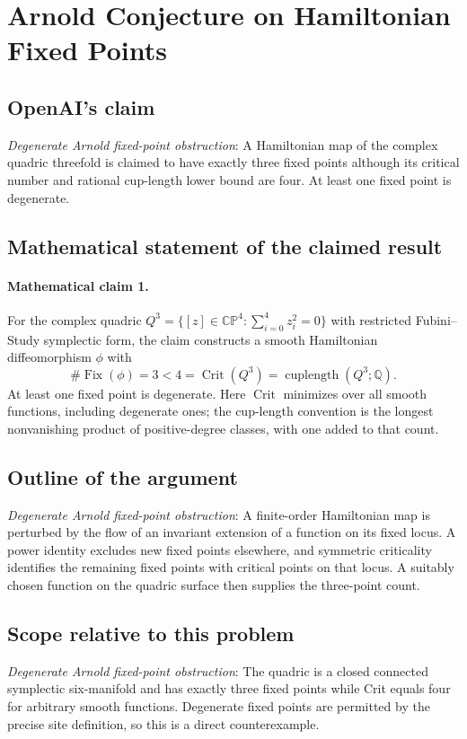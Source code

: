 \documentclass[11pt]{article}
\begin{document}
\section*{Arnold Conjecture on Hamiltonian Fixed Points}

\subsection{OpenAI's claim}
\textit{Degenerate Arnold fixed-point obstruction}: A Hamiltonian map of the complex quadric threefold is claimed to have exactly three fixed points although its critical number and rational cup-length lower bound are four. At least one fixed point is degenerate.

\subsection{Mathematical statement of the claimed result}
\paragraph{Mathematical claim 1.} For the complex quadric $Q^3=\{[z]\in\mathbb{CP}^4:\sum_{i=0}^4z_i^2=0\}$ with restricted Fubini--Study symplectic form, the claim constructs a smooth Hamiltonian diffeomorphism $\phi$ with \[\#\operatorname{Fix}(\phi)=3<4=\operatorname{Crit}(Q^3)=\operatorname{cuplength}(Q^3;\mathbb Q).\] At least one fixed point is degenerate. Here $\operatorname{Crit}$ minimizes over all smooth functions, including degenerate ones; the cup-length convention is the longest nonvanishing product of positive-degree classes, with one added to that count.

\subsection{Outline of the argument}
\textit{Degenerate Arnold fixed-point obstruction}: A finite-order Hamiltonian map is perturbed by the flow of an invariant extension of a function on its fixed locus. A power identity excludes new fixed points elsewhere, and symmetric criticality identifies the remaining fixed points with critical points on that locus. A suitably chosen function on the quadric surface then supplies the three-point count.

\subsection{Scope relative to this problem}
\textit{Degenerate Arnold fixed-point obstruction}: The quadric is a closed connected symplectic six-manifold and has exactly three fixed points while Crit equals four for arbitrary smooth functions. Degenerate fixed points are permitted by the precise site definition, so this is a direct counterexample.
\end{document}
